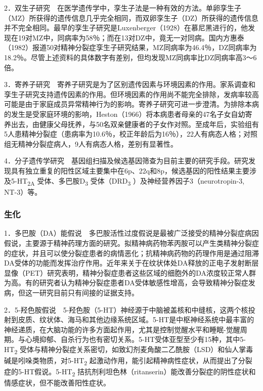 2．双生子研究　在医学遗传学中，孪生子法是一种有效的方法。单卵孪生子（MZ）所获得的遗传信息几乎完全相同，而双卵孪生子（DZ）所获得的遗传信息并不完全相同。最早的孪生子研究是Luxenberger（1928）在慕尼黑进行的，他发现在19对MZ中，同病率为58％；而在13对DZ中，竟无一对同病。国内方惠泰（1982）报道50对精神分裂症孪生子研究结果，MZ同病率为46.4％，DZ同病率为18.2％。尽管上述资料的具体数字有差别，但均发现MZ同病率比DZ同病率高3～6倍。

3．寄养子研究　寄养子研究是为了区别遗传因素与环境因素的作用。家系调查和孪生子研究支持遗传因素的作用。但环境因素的作用尚不能完全排除，发病率较高可能是由于家庭成员异常精神行为的影响。寄养子研究可进一步澄清。为排除本病的发生是受家庭环境的影响，Heston（1966）将本病患者母亲的47名子女自幼寄养出去，由健康父母抚养，与50名双亲健康者的子女作对照。至成年后，实验组有5人患精神分裂症（患病率为10.6％，校正年龄后为16％），22人有病态人格；对照组无精神分裂症病人，9人有病态人格，差别有显著性。

4．分子遗传学研究　基因组扫描及候选基因筛查为目前主要的研究手段。研究发现具有独立重复的阳性区域主要集中在6p、22q和8p，候选基因的阳性结果主要涉及5-HT\textsubscript{2A}
受体、多巴胺D\textsubscript{3} 受体（DRD\textsubscript{3}
）及神经营养因子3（neurotropin-3, NT-3）等。

\subsubsection{生化}

1．多巴胺（DA）能假说　多巴胺活性过度假说是最被广泛接受的精神分裂症病因假说，主要源于精神药理方面的研究。拟精神病药物苯丙胺可以产生类精神分裂症的症状，并且可以使分裂症患者的病情恶化；抗精神病药物的药理作用是通过阻滞DA受体的功能而发挥治疗作用。近年来关于在纹状体处DA释放的正电子发射断层显像（PET）研究表明，精神分裂症患者这些区域的细胞外的DA浓度较正常人群为高。有的研究者认为精神分裂症患者DA受体敏感性增高，会导致精神分裂症发病，但这一研究目前只有间接的证据支持。

2．5-羟色胺假说　5-羟色胺（5-HT）神经源于中脑被盖核和中缝核，这两个核投射到皮质、纹状体、海马和其他边缘系统区域。5-HT是中枢神经系统中最丰富的神经递质，在大脑功能的许多方面起作用，尤其是控制觉醒水平和睡眠-觉醒周期。与心境抑郁、自杀行为也有密切关系。5-HT受体亚型至少有15种，其中5-HT\textsubscript{2}
受体与精神分裂症关系密切，如致幻剂麦角酸二乙酰胺（LSD）和仙人掌毒碱是吲哚类物质，对5-HT\textsubscript{2}
起激动作用，能引起精神病性症状，从而提出了分裂症的5-HT假说。5-HT\textsubscript{2}
拮抗剂利坦色林（ritanserin）能改善分裂症的阴性症状和情感症状，但不能改善阳性症状。

